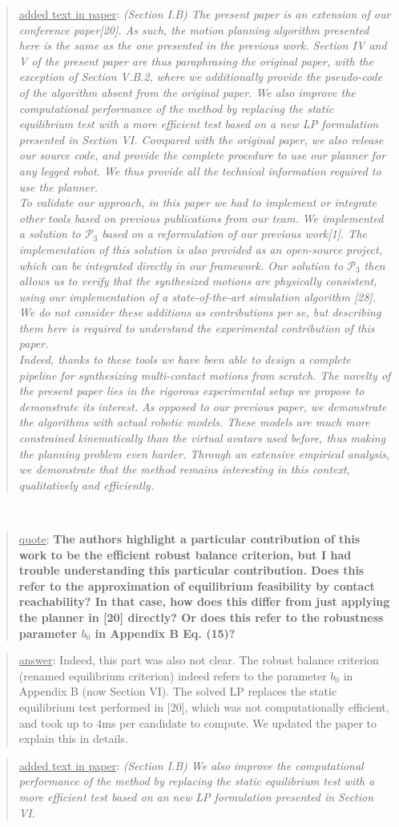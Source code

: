 \documentclass[a4paper]{article}
\newcommand{\done}[0]{}
\newcommand\quot[1]{\begin{quote} \underline{quote}: \textbf{#1}\end{quote}}
\newcommand\as[1]{\begin{quote} \underline{answer}: {#1}\end{quote} }
\newcommand\qt[1]{\begin{quote} \underline{added text in paper}: \textit{#1}\end{quote} \leavevmode \\ }
\begin{document}
\qt{(Section I.B)  The present paper is an extension of our conference paper[20]. As such, the motion planning algorithm presented here is the same as the one presented in the
previous work. Section IV and V of the present paper are thus paraphrasing the original paper, with the exception of Section V.B.2, where we additionally provide the pseudo-code of the algorithm absent from the original paper. We also improve the computational performance of the method by replacing the static equilibrium test with a more efficient test based on a new LP formulation presented in Section VI.
Compared with the original paper, we also release our source code, and provide the complete procedure to use our planner for any legged robot. We thus provide
all the technical information required to use the planner.\\
To validate our approach, in this paper we had to implement or integrate other tools based on previous publications from our team. We implemented a solution to $\mathcal{P}_3$ based on a reformulation of our previous work[1]. The implementation of this solution is also provided as an open-source project, which can be integrated directly in our framework. Our solution to $\mathcal{P}_3$ then allows us to verify that the synthesized motions are physically consistent, using our implementation of a state-of-the-art simulation algorithm [28].
We do not consider these additions as contributions per se, but describing them here is required to understand the experimental contribution of this paper.\\
Indeed, thanks to these tools we have been able to design a complete pipeline for synthesizing multi-contact motions from scratch.
The novelty of the present paper lies in the rigorous experimental setup we propose to demonstrate its interest.
As opposed to our previous paper, we demonstrate the algorithms with actual robotic models. These models are much more constrained kinematically than the virtual avatars used before,
thus making the planning problem even harder. Through an extensive empirical analysis, we demonstrate that the method remains interesting in this context, qualitatively and efficiently.}\done

\quot{The authors highlight a particular
contribution of this work to be the efficient robust balance criterion,
but I had trouble understanding this particular contribution. Does this
refer to the approximation of equilibrium feasibility by contact
reachability? In that case, how does this differ from just applying the
planner in [20] directly? Or does this refer to the robustness
parameter $b_0$ in Appendix B Eq. (15)?}
\as{Indeed, this part was also not clear. The robust balance criterion (renamed equilibrium criterion) indeed refers to the parameter $b_0$ in Appendix B (now Section VI). The solved
LP replaces the static equilibrium test performed in [20], which was not computationally efficient, and took up to 4ms per candidate to compute. We updated the paper to explain
this in details.}
\qt{(Section I.B) We also improve the computational performance
of the method by replacing the static equilibrium test with a more efficient test based on an
new LP formulation presented in Section VI.}
\done
\end{document}
